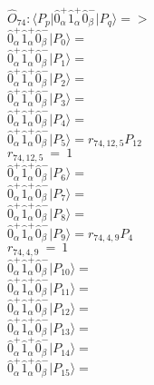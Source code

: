 \documentclass[14pt]{article}
\begin{document}
    $\hat{O}_{74}:  \langle{P_p}\vert \hat{0}_{\alpha}^{+}\hat{1}_{\alpha}^{+}\hat{0}_{\beta}^{-} \vert{P_q}\rangle => $ \\ 
    $ \hat{0}_{\alpha}^{+}\hat{1}_{\alpha}^{+}\hat{0}_{\beta}^{-} \vert{P_{0}}\rangle =  $ \\ 
    $ \hat{0}_{\alpha}^{+}\hat{1}_{\alpha}^{+}\hat{0}_{\beta}^{-} \vert{P_{1}}\rangle =  $ \\ 
    $ \hat{0}_{\alpha}^{+}\hat{1}_{\alpha}^{+}\hat{0}_{\beta}^{-} \vert{P_{2}}\rangle =  $ \\ 
    $ \hat{0}_{\alpha}^{+}\hat{1}_{\alpha}^{+}\hat{0}_{\beta}^{-} \vert{P_{3}}\rangle =  $ \\ 
    $ \hat{0}_{\alpha}^{+}\hat{1}_{\alpha}^{+}\hat{0}_{\beta}^{-} \vert{P_{4}}\rangle =  $ \\ 
    $ \hat{0}_{\alpha}^{+}\hat{1}_{\alpha}^{+}\hat{0}_{\beta}^{-} \vert{P_{5}}\rangle = {r}_{74,12,5}P_{12} $ \\ 
    ${r}_{74,12,5}\ =\ 1 $ \\ 
    $ \hat{0}_{\alpha}^{+}\hat{1}_{\alpha}^{+}\hat{0}_{\beta}^{-} \vert{P_{6}}\rangle =  $ \\ 
    $ \hat{0}_{\alpha}^{+}\hat{1}_{\alpha}^{+}\hat{0}_{\beta}^{-} \vert{P_{7}}\rangle =  $ \\ 
    $ \hat{0}_{\alpha}^{+}\hat{1}_{\alpha}^{+}\hat{0}_{\beta}^{-} \vert{P_{8}}\rangle =  $ \\ 
    $ \hat{0}_{\alpha}^{+}\hat{1}_{\alpha}^{+}\hat{0}_{\beta}^{-} \vert{P_{9}}\rangle = {r}_{74,4,9}P_{4} $ \\ 
    ${r}_{74,4,9}\ =\ 1 $ \\ 
    $ \hat{0}_{\alpha}^{+}\hat{1}_{\alpha}^{+}\hat{0}_{\beta}^{-} \vert{P_{10}}\rangle =  $ \\ 
    $ \hat{0}_{\alpha}^{+}\hat{1}_{\alpha}^{+}\hat{0}_{\beta}^{-} \vert{P_{11}}\rangle =  $ \\ 
    $ \hat{0}_{\alpha}^{+}\hat{1}_{\alpha}^{+}\hat{0}_{\beta}^{-} \vert{P_{12}}\rangle =  $ \\ 
    $ \hat{0}_{\alpha}^{+}\hat{1}_{\alpha}^{+}\hat{0}_{\beta}^{-} \vert{P_{13}}\rangle =  $ \\ 
    $ \hat{0}_{\alpha}^{+}\hat{1}_{\alpha}^{+}\hat{0}_{\beta}^{-} \vert{P_{14}}\rangle =  $ \\ 
    $ \hat{0}_{\alpha}^{+}\hat{1}_{\alpha}^{+}\hat{0}_{\beta}^{-} \vert{P_{15}}\rangle =  $ \\ 
    
\end{document}
